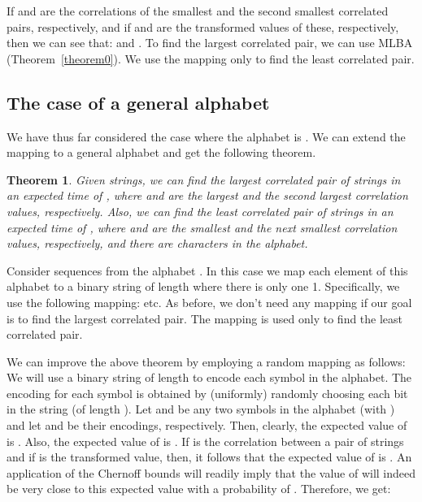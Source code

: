 \documentclass{article}
\newtheorem{theorem}{Theorem}[section]
\theoremstyle{definition}
\theoremstyle{remark}
\begin{document}
 If  and  are the correlations of the smallest and the second smallest correlated pairs, respectively, and if  and  are the transformed values of these, respectively, then we can see that:  and . To find the largest correlated pair, we can use MLBA (Theorem~\ref{theorem0}). We use the mapping only to find the least correlated pair. 

 \subsection{The case of a general alphabet}
 We have thus far considered the case where the alphabet is . We can extend the mapping to a general alphabet and get the following theorem.

\begin{theorem}
 Given  strings, we can find the largest correlated pair of strings in an expected time of  \newline , where  and  are the largest and the second largest correlation values, respectively. Also, we can find the least correlated pair of strings in an expected  time of \protect\linebreak , where  and  are the smallest and the next smallest correlation values, respectively, and there are  characters in the alphabet.
 \end{theorem}

 Consider sequences from the alphabet . In this case we map each element of this alphabet to a binary string of length  where there is only one 1. Specifically, we use the following mapping:  etc. As before, we don't need any mapping if our goal is to find the largest correlated pair. The mapping is used only to find the least correlated pair. 

 We can improve the above theorem by employing a random mapping as follows: We will use a binary string of length  to encode each symbol in the alphabet. The encoding for each symbol is obtained by (uniformly) randomly choosing each bit in the string (of length ). Let  and  be any two symbols in the alphabet (with ) and let  and  be their encodings, respectively. Then, clearly, the expected value of  is . Also, the expected value of  is . If  is the correlation between a pair of strings and if  is the transformed value, then, it follows that the expected value of  is . An application of the Chernoff bounds will readily imply that the value of  will indeed be very close to this expected value with a probability of . Therefore, we get:
\end{document}
